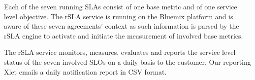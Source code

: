 Each of the seven running SLAs consist of one base metric and of one service level objective. The rSLA service is running on the Bluemix platform and is aware of these seven agreements' context as such information is parsed by the rSLA engine to activate and initiate the measurement of involved base metrics. 

The rSLA service monitors, measures, evaluates and reports the service level status of the seven involved SLOs on a daily basis to the customer. Our reporting Xlet emails a daily notification report in CSV format.


